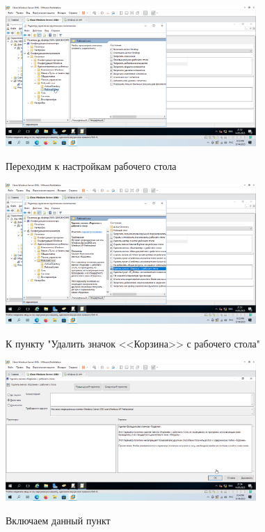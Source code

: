 \documentclass[a4paper]{article}
\begin{document}
  \begin{figure}[H]
    \centering
    \includegraphics[width=0.85\textwidth]{5_0139}
    \label{img:139}
    \caption{Переходим к настройкам рабочего стола}
  \end{figure}

  \begin{figure}[H]
    \centering
    \includegraphics[width=0.85\textwidth]{5_0140}
    \label{img:140}
    \caption{К пункту "Удалить значок <<Корзина>> с рабочего стола"}
  \end{figure}

  \begin{figure}[H]
    \centering
    \includegraphics[width=0.85\textwidth]{5_0141}
    \label{img:141}
    \caption{Включаем данный пункт}
  \end{figure}
\end{document}
